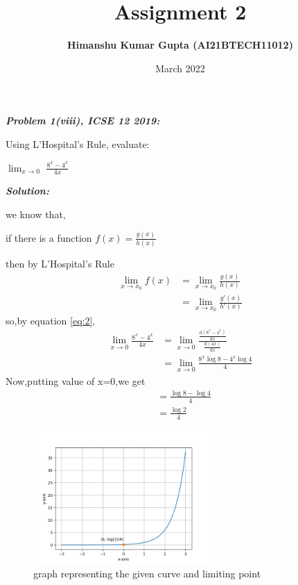 \documentclass[journal,12pt,twocolumn]{IEEEtran}
\begin{document}
\newcommand{\myvec}[1]{\ensuremath{\begin{pmatrix}#1\end{pmatrix}}}

\let\vec\mathbf


\title{Assignment 2}
\author{\textbf{Himanshu Kumar Gupta (AI21BTECH11012)}}
\maketitle
\date {March 2022}


\textbf{\textit{Problem 1(viii), ICSE 12 2019:}}

Using L’Hospital’s Rule, evaluate:

 $\lim_{x\to0}$ $\frac{8^x-4^x}{4x}$

\textbf{\textit{Solution:}}

we know that,

if there is a function $f(x)=\frac{g(x)}{h(x)}$

then by L’Hospital’s Rule 
\begin{align}
\lim_{x\to x_0} f(x)&=\lim_{x\to x_0} \frac{g(x)}{h(x)}  \\
\label{eq:2}
&=\lim_{x\to x_0} \frac{g'(x)}{h'(x)}
\end{align}
so,by equation \eqref{eq:2},
\begin{align}
\lim_{x\to0} \frac{8^x-4^x}{4x}&=\lim_{x\to0}
 \frac{\frac{\mathrm{d}(8^x-4^x)}{\mathrm{d}x}}{\frac{\mathrm{d}(4x)}{\mathrm{d}x}} \\
&=\lim_{x\to0}\frac{8^x\log{8}-4^x\log{4}}{4}
\end{align}
Now,putting value of x=0,we get
\begin{align}
&=\frac{\log{8}-\log{4}}{4}       \\
&=\frac{\log{2}}{4}
\end{align}

\begin{figure}[htb!]
\includegraphics[width=0.60\textwidth]{figures/Figure_2.png}
\caption{graph representing the given curve and limiting point}
\end{figure}
\end{document}
